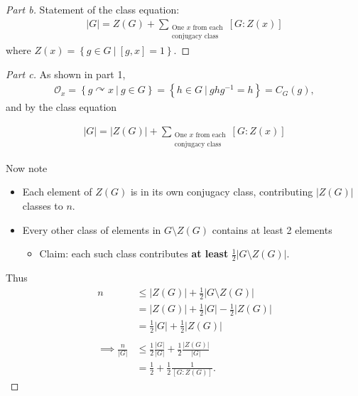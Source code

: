 \begin{solution}
\begin{proof}[Part b]

Statement of the class equation:
\begin{align*}
{\left\lvert {G} \right\rvert} = Z(G) + \sum_{\substack{\text{One $x$ from each} \\ \text{conjugacy class}}}[G: Z(x)]
\end{align*}
where \(Z(x) = \left\{{g\in G {~\mathrel{\Big|}~}[g, x] = 1}\right\}\).

\end{proof}

\begin{proof}[Part c]

As shown in part 1,
\begin{align*}
\mathcal{O}_x = \left\{{g\curvearrowright x {~\mathrel{\Big|}~}g\in G}\right\} = \left\{{h\in G {~\mathrel{\Big|}~}ghg^{-1}= h}\right\} = C_G(g)
,\end{align*}
and by the class equation

\begin{align*}
{\left\lvert {G} \right\rvert} = {\left\lvert {Z(G)} \right\rvert} + \sum_{\substack{\text{One $x$ from each} \\ \text{conjugacy class}}}[G: Z(x)]
\end{align*}

Now note

\begin{itemize}
\item
  Each element of \(Z(G)\) is in its own conjugacy class, contributing
  \({\left\lvert {Z(G)} \right\rvert}\) classes to \(n\).
\item
  Every other class of elements in \(G\setminus Z(G)\) contains at least
  2 elements

  \begin{itemize}
  \tightlist
  \item
    Claim: each such class contributes \textbf{at least}
    \(\frac 1 2 {\left\lvert {G \setminus Z(G)} \right\rvert}\).
  \end{itemize}
\end{itemize}

Thus
\begin{align*}
n &\leq {\left\lvert {Z(G)} \right\rvert} + \frac 1 2{\left\lvert {G \setminus Z(G)} \right\rvert} \\
&= {\left\lvert {Z(G)} \right\rvert} + \frac 1 2{\left\lvert {G} \right\rvert} - \frac 1 2 {\left\lvert {Z(G)} \right\rvert} \\
&= \frac 1 2 {\left\lvert {G} \right\rvert} + \frac 1 2 {\left\lvert {Z(G)} \right\rvert} \\
\\
\implies \frac n {{\left\lvert {G} \right\rvert}}
&\leq \frac 1 2 \frac{{\left\lvert {G} \right\rvert}}{{\left\lvert {G} \right\rvert}}  + \frac 1 2 \frac{{\left\lvert {Z(G)} \right\rvert}}{{\left\lvert {G} \right\rvert}} \\
&= \frac 1 2 + \frac 1 2 \frac 1 {[G: Z(G)]}
.\end{align*}


\end{proof}
\end{solution}
